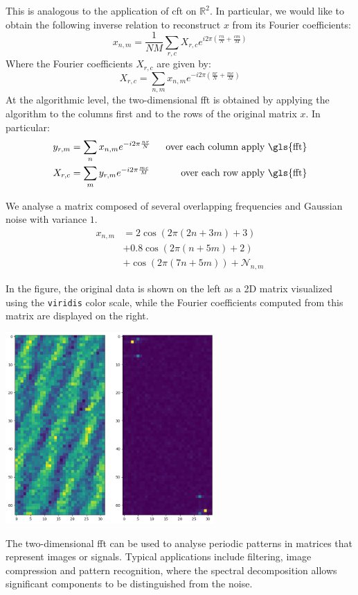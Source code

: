 \noindent This is analogous to the application of \gls{cft} on $\mathbb{R}^2$. In particular, we would like to obtain the following inverse relation to reconstruct $x$ from its Fourier coefficients:
\begin{equation}
	x_{n,m} = \frac{1}{NM}\sum_{r,c} X_{r,c} e^{i2\pi\left(\frac{rn}{N} + \frac{cm}{M}\right)}
\end{equation}
Where the Fourier coefficients $X_{r,c}$ are given by:
\begin{equation}
	X_{r,c} = \sum_{n,m} x_{n,m}e^{-i2\pi\left(\frac{nr}{N} + \frac{mc}{M}\right)}
\end{equation}
At the algorithmic level, the two-dimensional \gls{fft} is obtained by applying the algorithm to the columns first and to the rows of the original matrix $x$. In particular:
\begin{align*}
	y_{r,m} &= \sum_{n} x_{n,m}e^{-i2\pi\frac{nr}{N}} & \;\;\text{over each column apply \gls{fft}}\\
	X_{r,c} &=\sum_{m}y_{r,m}e^{-i2\pi\frac{mc}{M}} & \;\;\text{over each row apply \gls{fft}}
\end{align*}
\begin{exempli_gratia}
	We analyse a matrix composed of several overlapping frequencies and Gaussian noise with variance $1$.
	\begin{align*}
	x_{n,m} &= 2\cos\left(2\pi(2n + 3m) + 3\right) \\
	&+ 0.8\cos\left(2\pi(n + 5m) + 2\right) \\
	&+ \cos\left(2\pi(7n + 5m)\right) + \mathcal{N}_{n,m}
	\end{align*}
	\begin{modified}
		In the figure, the original data is shown on the left as a 2D matrix visualized using the \texttt{viridis} color scale, while the Fourier coefficients computed from this matrix are displayed on the right.
	\end{modified}
	\begin{center}
		\centering \includegraphics[width=0.6\textwidth]{Figures/fft2d_example.png}
	\end{center}
\end{exempli_gratia}

\noindent The two-dimensional \gls{fft} can be used to analyse periodic patterns in matrices that represent images or signals. Typical applications include filtering, image compression and pattern recognition, where the spectral decomposition allows significant components to be distinguished from the noise.
